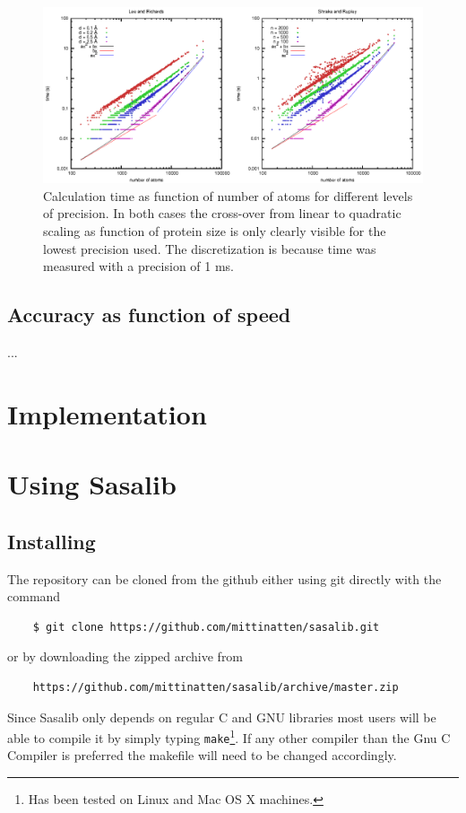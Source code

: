 \documentclass[a4paper,11pt]{article}
\begin{document}
\begin{figure}
  \includegraphics{../analysis/plots/time}
  \caption{Calculation time as function of number of atoms for
    different levels of precision. In both cases the cross-over from
    linear to quadratic scaling as function of protein size is only
    clearly visible for the lowest precision used. The discretization
    is because time was measured with a precision of 1
    ms.\label{fig:time}}
\end{figure}

\subsection{Accuracy as function of speed}

...


\section{Implementation}

\section{Using Sasalib}

\subsection{Installing}

The repository can be cloned from the github either using git
directly with the command
\begin{verbatim}
    $ git clone https://github.com/mittinatten/sasalib.git
\end{verbatim}
or by downloading the zipped archive from
\begin{verbatim}
    https://github.com/mittinatten/sasalib/archive/master.zip
\end{verbatim}
Since Sasalib only depends on regular C and GNU libraries most users
will be able to compile it by simply typing \texttt{make}\footnote{Has
  been tested on Linux and Mac OS X machines.}. If any other compiler
than the Gnu C Compiler is preferred the makefile will need to be
changed accordingly.
\end{document}
